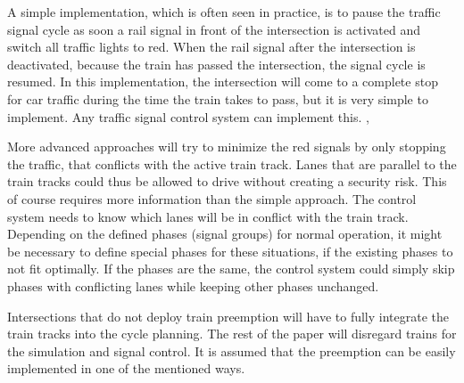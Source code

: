 A simple implementation, which is often seen in practice, is to pause the traffic signal cycle as soon a rail signal in front of the intersection is activated and switch all traffic lights to red. When the rail signal after the intersection is deactivated, because the train has passed the intersection, the signal cycle is resumed. In this implementation, the intersection will come to a complete stop for car traffic during the time the train takes to pass, but it is very simple to implement. Any traffic signal control system can implement this. \cite{mutcd}, \cite{ptsnrc}

More advanced approaches will try to minimize the red signals by only stopping the traffic, that conflicts with the active train track. Lanes that are parallel to the train tracks could thus be allowed to drive without creating a security risk. This of course requires more information than the simple approach. The control system needs to know which lanes will be in conflict with the train track. Depending on the defined phases (signal groups) for normal operation, it might be necessary to define special phases for these situations, if the existing phases to not fit optimally. If the phases are the same, the control system could simply skip phases with conflicting lanes while keeping other phases unchanged.

Intersections that do not deploy train preemption will have to fully integrate the train tracks into the cycle planning. The rest of the paper will disregard trains for the simulation and signal control. It is assumed that the preemption can be easily implemented in one of the mentioned ways.
